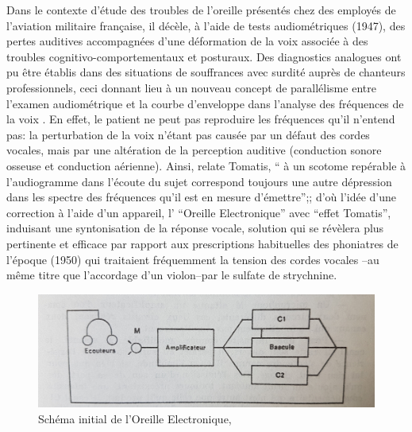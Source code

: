   Dans le contexte d'étude des troubles de
l'oreille présentés chez des employés de l'aviation militaire
française, il décèle, à l'aide
de tests audiométriques
 (1947), des pertes auditives accompagnées d'une
déformation de la voix associée à des troubles
cognitivo-comportementaux et posturaux. %
Des diagnostics analogues ont pu être établis dans des situations
de souffrances avec surdité auprès de chanteurs professionnels,
ceci donnant lieu
à un nouveau concept de
parallélisme entre l'examen audiométrique et la courbe
d'enveloppe dans l'analyse des fréquences de la voix \autocite {tomatisoreilletvie}.
En effet, le patient ne peut pas reproduire les fréquences qu'il
n'entend pas:
la perturbation de la voix n'étant pas causée par un défaut des cordes
vocales, mais par une altération de la perception auditive (conduction
sonore osseuse et conduction aérienne). Ainsi, relate Tomatis, \enquote{ à un scotome repérable à 
l'audiogramme dans l'écoute du sujet correspond toujours une autre dépression dans les spectre des 
fréquences qu'il est en mesure d'émettre};\autocite [75] {tomatisoreilletvie}; d'où
l'idée d'une correction à l'aide d'un appareil, l' ``Oreille
Electronique'' avec ``effet Tomatis'', induisant
une syntonisation de la réponse vocale, solution qui se révèlera plus pertinente et efficace par rapport aux prescriptions habituelles des phoniatres de
l'époque (1950) qui traitaient fréquemment la tension des cordes vocales --au même titre que
l'accordage d'un violon--par le sulfate de
strychnine\autocite {tomatisoreilletvie}.
	\\
\begin{figure}[h]
	\centering
	\includegraphics[width=0.7\linewidth]{images/oreilleelectro.jpg}
	\caption[L'Oreille
	Electronique: schéma]{Schéma initial de l'Oreille
		Electronique,\autocite[p.~97] {tomatisoreilletvie}}
	\label{oreilleelectro}
\end{figure}

